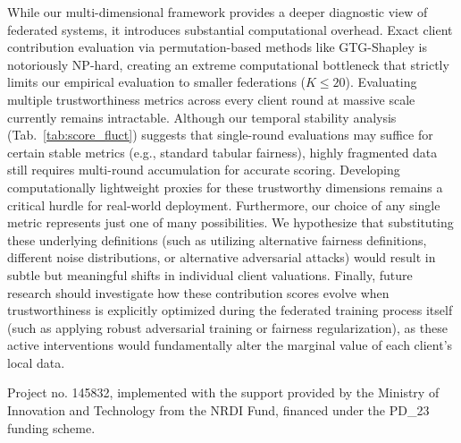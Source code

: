\documentclass[acmsmall]{acmart}
\begin{document}
While our multi-dimensional framework provides a deeper diagnostic view of federated systems, it introduces substantial computational overhead. Exact client contribution evaluation via permutation-based methods like GTG-Shapley is notoriously NP-hard, creating an extreme computational bottleneck that strictly limits our empirical evaluation to smaller federations ($K \le 20$). Evaluating multiple trustworthiness metrics across every client round at massive scale currently remains intractable. Although our temporal stability analysis (Tab.~\ref{tab:score_fluct}) suggests that single-round evaluations may suffice for certain stable metrics (e.g., standard tabular fairness), highly fragmented data still requires multi-round accumulation for accurate scoring. Developing computationally lightweight proxies for these trustworthy dimensions remains a critical hurdle for real-world deployment. Furthermore, our choice of any single metric represents just one of many possibilities. We hypothesize that substituting these underlying definitions (such as utilizing alternative fairness definitions, different noise distributions, or alternative adversarial attacks) would result in subtle but meaningful shifts in individual client valuations. Finally, future research should investigate how these contribution scores evolve when trustworthiness is explicitly optimized during the federated training process itself (such as applying robust adversarial training or fairness regularization), as these active interventions would fundamentally alter the marginal value of each client's local data.

\begin{acks}
    \small
    Project no. 145832, implemented with the support provided by the Ministry of Innovation and Technology from the NRDI Fund, financed under the PD\_23 funding scheme.
\end{acks}




\appendix

\end{document}
